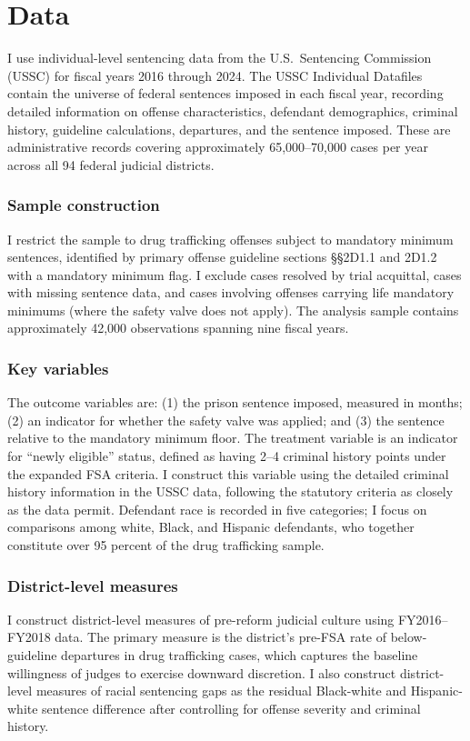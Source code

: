 \documentclass[12pt]{article}
\begin{document}
\section{Data}

I use individual-level sentencing data from the U.S.\ Sentencing Commission (USSC) for fiscal years 2016 through 2024. The USSC Individual Datafiles contain the universe of federal sentences imposed in each fiscal year, recording detailed information on offense characteristics, defendant demographics, criminal history, guideline calculations, departures, and the sentence imposed. These are administrative records covering approximately 65,000--70,000 cases per year across all 94 federal judicial districts.

\subsubsection*{Sample construction}
I restrict the sample to drug trafficking offenses subject to mandatory minimum sentences, identified by primary offense guideline sections \S\S 2D1.1 and 2D1.2 with a mandatory minimum flag. I exclude cases resolved by trial acquittal, cases with missing sentence data, and cases involving offenses carrying life mandatory minimums (where the safety valve does not apply). The analysis sample contains approximately 42,000 observations spanning nine fiscal years.

\subsubsection*{Key variables}
The outcome variables are: (1) the prison sentence imposed, measured in months; (2) an indicator for whether the safety valve was applied; and (3) the sentence relative to the mandatory minimum floor. The treatment variable is an indicator for ``newly eligible'' status, defined as having 2--4 criminal history points under the expanded FSA criteria. I construct this variable using the detailed criminal history information in the USSC data, following the statutory criteria as closely as the data permit. Defendant race is recorded in five categories; I focus on comparisons among white, Black, and Hispanic defendants, who together constitute over 95 percent of the drug trafficking sample.

\subsubsection*{District-level measures}
I construct district-level measures of pre-reform judicial culture using FY2016--FY2018 data. The primary measure is the district's pre-FSA rate of below-guideline departures in drug trafficking cases, which captures the baseline willingness of judges to exercise downward discretion. I also construct district-level measures of racial sentencing gaps as the residual Black-white and Hispanic-white sentence difference after controlling for offense severity and criminal history.
\end{document}
